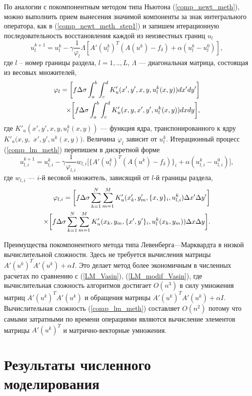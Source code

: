 По аналогии с покомпонентным методом типа Ньютона (\ref{comp_newt_meth}), можно выполнить прием вынесения значимой компоненты за знак интегрального оператора, как в (\ref{comp_newt_meth_step1}) и запишем итерационную последовательность восстановления каждой из неизвестных границ $u_l$
\begin{equation}\label{comp_lm_meth}
u_l^{k+1}=u_l^k-\gamma\frac{1}{\varphi_l}\Lambda[ A'(u_l^k)^T(A(u^k)-f_\delta)+\alpha (u_l^k-u_l^0)],
\end{equation}
где $l$ -- номер границы раздела, $l=1,..,L$, $\Lambda$ --- диагональная матрица, состоящая из весовых множителей, 
\begin{equation*}
\begin{aligned}
\varphi_l=\bigg[ f\Delta\sigma\int_{a}^{b}\int_{c}^{d}
K'_u(x',y', x, y, u_l^k(x,y))dx'dy'\bigg] \notag \\ \times\bigg[f\Delta\sigma\int_{a}^{b}\int_{c}^{d}K'_u(x,y, x',y',u_l^k(x,y))dxdy\bigg], 
\end{aligned}
\end{equation*} 
где $K'_u(x',y', x, y, u_l^k(x,y))$ --- функция ядра, транспонированного к ядру $K'_u(x,y,$ $ x',y',u^k(x,y))$. Величина $\varphi_l$ зависит от $u_l^k$.
Итерационный процесс (\ref{comp_lm_meth}) перепишем в дискретной форме
\begin{equation}\label{comp_lm_meth_disc}
u_{l,i}^{k+1}=u_{l,i}^k-\gamma\frac{1}{\varphi_{l,i}}w_{l,i}\bigg[ \{A'(u_l^k)^T(A(u^k)-f_\delta)\}_i+\alpha (u_{l,i}^k-u_{l,i}^0)\bigg],
\end{equation}
где $w_{l,i}$ --- $i$-й весовой множитель, зависящий от $l$-й границы раздела,
\begin{equation*}
\begin{aligned}
\varphi_{l,i}=\bigg[ f\Delta\sigma\sum\limits_{k=1}^{N}
\sum\limits_{m=1}^{M}
K'_u(x'_k,y'_m, \{x, y\}_i, u_{l,i}^k) \Delta x' \Delta y'\bigg] \notag \\ \times\bigg[f\Delta\sigma\sum\limits_{k=1}^{N}
\sum\limits_{m=1}^{M}K'_u(x_k,y_m, \{x',y'\}_i,u_l^k(x_k,y_m))\Delta x \Delta y\bigg]. 
\end{aligned}
\end{equation*}

Преимущества покомпонентного метода типа Левенберга---Марквардта в низкой вычислительной сложности. Здесь не требуется вычисления матрицы $A'(u^k)^T A'(u^k)+\alpha I$. Это делает метод более экономичным в численных расчетах по сравнению с (\ref{LM_Vasin}), (\ref{LM_modif_Vasin}), где вычислительная сложность алгоритмов достигает $O(n^3)$ в силу умножения матриц $A'(u^k)^T A'(u^k)$ и обращения матрицы $A'(u^k)^T A'(u^k)+\alpha I$. Вычислительная сложность (\ref{comp_lm_meth}) составляет $O(n^2)$ потому что самыми затратными по времени операциями являются вычисление элементов матрицы $A'(u^k)^T$ и матрично-векторные умножения.

\section{Результаты численного моделирования}